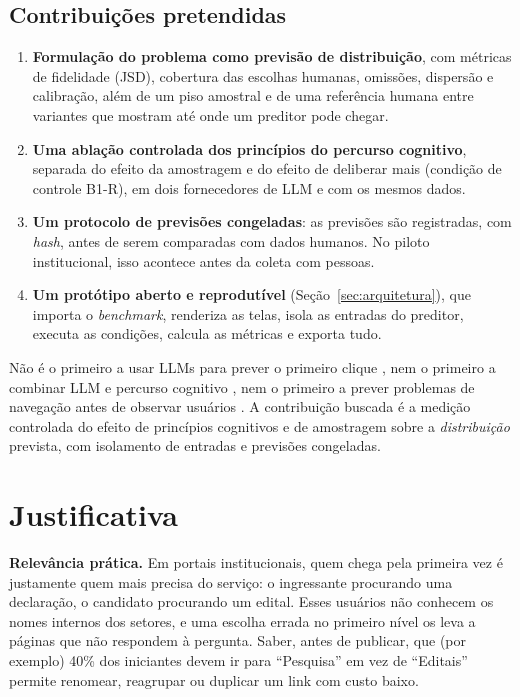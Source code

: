 \documentclass[12pt]{article}
\begin{document}
\subsection{Contribuições pretendidas}

\begin{enumerate}[leftmargin=*]
\item \textbf{Formulação do problema como previsão de distribuição}, com métricas de fidelidade (JSD), cobertura das escolhas humanas, omissões, dispersão e calibração, além de um piso amostral e de uma referência humana entre variantes que mostram até onde um preditor pode chegar.
\item \textbf{Uma ablação controlada dos princípios do percurso cognitivo}, separada do efeito da amostragem e do efeito de deliberar mais (condição de controle B1-R), em dois fornecedores de LLM e com os mesmos dados.
\item \textbf{Um protocolo de previsões congeladas}: as previsões são registradas, com \textit{hash}, antes de serem comparadas com dados humanos. No piloto institucional, isso acontece antes da coleta com pessoas.
\item \textbf{Um protótipo aberto e reprodutível} (Seção~\ref{sec:arquitetura}), que importa o \textit{benchmark}, renderiza as telas, isola as entradas do preditor, executa as condições, calcula as métricas e exporta tudo.
\end{enumerate}

\begin{nota}
Não é o primeiro a usar LLMs para prever o primeiro clique \cite{kuric2026wwgc}, nem o primeiro a combinar LLM e percurso cognitivo \cite{bisante2024cwgpt,zhong2025syntheticcw}, nem o primeiro a prever problemas de navegação antes de observar usuários \cite{blackmon2002cww,blackmon2005autocww}. A contribuição buscada é a medição controlada do efeito de princípios cognitivos e de amostragem sobre a \emph{distribuição} prevista, com isolamento de entradas e previsões congeladas.
\end{nota}

\section{Justificativa}
\label{sec:justificativa}

\textbf{Relevância prática.} Em portais institucionais, quem chega pela primeira vez é justamente quem mais precisa do serviço: o ingressante procurando uma declaração, o candidato procurando um edital. Esses usuários não conhecem os nomes internos dos setores, e uma escolha errada no primeiro nível os leva a páginas que não respondem à pergunta. Saber, antes de publicar, que (por exemplo) 40\% dos iniciantes devem ir para ``Pesquisa'' em vez de ``Editais'' permite renomear, reagrupar ou duplicar um link com custo baixo.
\end{document}
